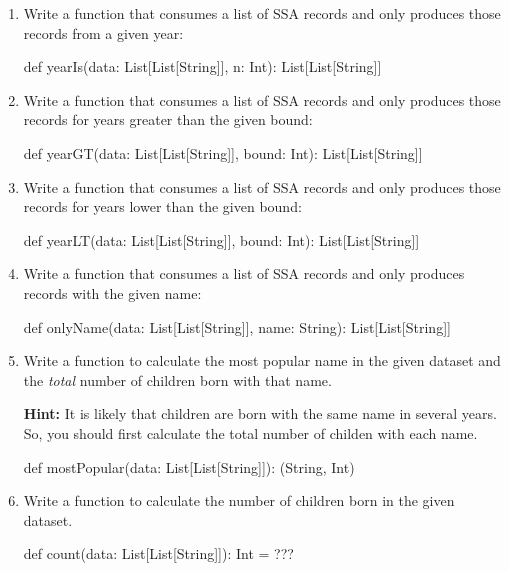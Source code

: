\documentclass[9pt]{extbook}
\begin{document}
\begin{enumerate}

  \item Write a function that consumes a list of SSA records and only produces
  those records from a given year:
  \begin{scalacode}
  def yearIs(data: List[List[String]], n: Int): List[List[String]]
  \end{scalacode}


  \item Write a function that consumes a list of SSA records and only produces
  those records for years greater than the given bound:
  \begin{scalacode}
  def yearGT(data: List[List[String]], bound: Int): List[List[String]]
  \end{scalacode}

  \item Write a function that consumes a list of SSA records and only produces
  those records for years lower than the given bound:
  \begin{scalacode}
  def yearLT(data: List[List[String]], bound: Int): List[List[String]]
  \end{scalacode}

  \item Write a function that consumes a list of SSA records and only produces
  records with the given name:
  \begin{scalacode}
  def onlyName(data: List[List[String]], name: String): List[List[String]]
  \end{scalacode}

  \item Write a function to calculate the most popular name in the given dataset
  and the \emph{total} number of children born with that name.

  \textbf{Hint:} It is likely that children are born with the same
      name in several years. So, you should first calculate the total
      number of childen with each name.
  
  \begin{scalacode}
  def mostPopular(data: List[List[String]]): (String, Int)
  \end{scalacode}

  \item Write a function to calculate the number of children born in the given dataset.
  \begin{scalacode}
  def count(data: List[List[String]]): Int = ???
  \end{scalacode}


\end{enumerate}
\end{document}
